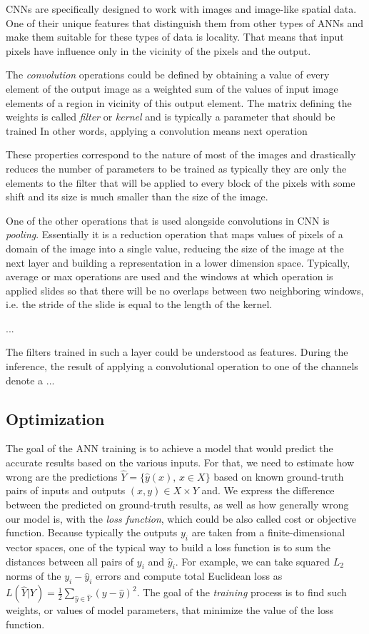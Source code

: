 CNNs are specifically designed to work with images and image-like spatial data.
One of their unique features that distinguish them from other types of ANNs and make them suitable for these types of data is locality.
That means that input pixels have influence only in the vicinity of the pixels and the output.

The \textit{convolution} operations could be defined by obtaining a value of every element of the output image as a weighted sum of the values of input image elements of a region in vicinity of this output element.
The matrix defining the weights is called \textit{filter} or \textit{kernel} and is typically a parameter that should be trained
In other words, applying a convolution means next operation

These properties correspond to the nature of most of the images and drastically reduces the number of parameters to be trained as typically they are only the elements to the filter that will be applied to every block of the pixels with some shift and its size is much smaller than the size of the image.

One of the other operations that is used alongside convolutions in CNN is \textit{pooling}.
Essentially it is a reduction operation that maps values of pixels of a domain of the image into a single value, reducing the size of the image at the next layer and building a representation in a lower dimension space. 
Typically, average or max operations are used and the windows at which operation is applied slides so that there will be no overlaps between two neighboring windows, i.e. the stride of the slide is equal to the length of the kernel.

...


The filters trained in such a layer could be understood as features. 
During the inference, the result of applying a convolutional operation to one of the channels denote a ...


\subsection{Optimization}

The goal of the ANN training is to achieve a model that would predict the accurate results based on the various inputs.
For that, we need to estimate how wrong are the predictions $\hat{Y} = \{\hat{y}(x), \, x \in X \}$ based on known ground-truth pairs of inputs and outputs $ (x, y) \in X \times Y $ and.
We express the difference between the predicted on ground-truth results, as well as how generally wrong our model is, with the \textit{loss function}, which could be also called cost or objective function.
Because typically the outputs $y_{i}$ are taken from a finite-dimensional vector spaces, one of the typical way to build a loss function is to sum the distances between all pairs of $y_{i}$ and $\hat{y}_{i}$.
For example, we can take squared $L_{2}$ norms of the $y_{i}-\hat{y}_{i}$ errors and compute total Euclidean loss as $ L(\hat{Y}|Y) = \frac{1}{2}\sum_{\hat{y} \in \hat{Y}}(y - \hat{y})^{2} $.
The goal of the \textit{training} process is to find such weights, or values of model parameters, that minimize the value of the loss function.

